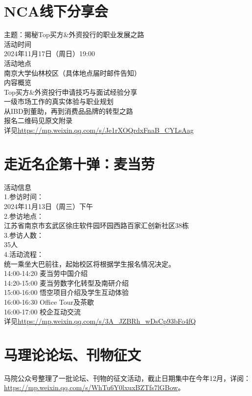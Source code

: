 \documentclass[letterpaper, 12pt]{article}
\begin{document}
\begin{multicols}{2}
\section{NCA线下分享会}
主题：揭秘Top买方\&外资投行的职业发展之路\\
活动时间\\
2024年11月17日（周日）19:00\\
活动地点\\
南京大学仙林校区（具体地点届时邮件告知）\\
内容概览\\
Top买方\&外资投行申请技巧与面试经验分享\\
一级市场工作的真实体验与职业规划\\
从IBD到董助，再到消费品品牌的转型之路\\
报名二维码见原文附录\\
详见\url{https://mp.weixin.qq.com/s/Je1rXOQrdxFnaB_CYLsAag}

\section{走近名企第十弹：麦当劳}
活动信息\\
1.参访时间：\\
2024年11月13日（周三）下午\\
2.参访地点：\\
江苏省南京市玄武区徐庄软件园环园西路百家汇创新社区38栋\\
3.参访人数：\\
35人\\
4.活动流程：\\
统一乘坐大巴前往，起始校区将根据学生报名情况决定。\\
14:00-14:20 麦当劳中国介绍\\
14:20-15:00 麦当劳数字化转型及南研介绍\\
15:00-16:00 悟空项目介绍及学生互动体验\\
16:00-16:30 Office Tour及茶歇\\
16:00-17:00 校企互动交流\\
详见\url{https://mp.weixin.qq.com/s/3A_JZBRh_wDsCp93bFo4fQ}\\

\section{马理论论坛、刊物征文}
马院公众号整理了一批论坛、刊物的征文活动，截止日期集中在今年12月，详阅：\url{https://mp.weixin.qq.com/s/WhTu6Y0lxuxBZTfs7lGBow}。




\end{multicols}
\end{document}
